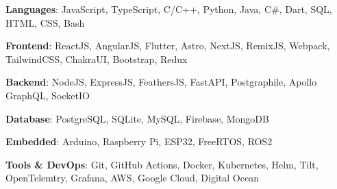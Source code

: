 \textbf{Languages}: JavaScript, TypeScript, C/C++, Python, Java, C\#, Dart, SQL, HTML, CSS, Bash \par
\textbf{Frontend}: ReactJS, AngularJS, Flutter, Astro, NextJS, RemixJS, Webpack, TailwindCSS, ChakraUI, Bootstrap, Redux \par
\textbf{Backend}: NodeJS, ExpressJS, FeathersJS, FastAPI, Postgraphile, Apollo GraphQL, SocketIO \par
\textbf{Database}: PostgreSQL, SQLite, MySQL, Firebase, MongoDB \par
\textbf{Embedded}: Arduino, Raspberry Pi, ESP32, FreeRTOS, ROS2 \par
\textbf{Tools & DevOps}: Git, GitHub Actions, Docker, Kubernetes, Helm, Tilt, OpenTelemtry, Grafana, AWS, Google Cloud, Digital Ocean